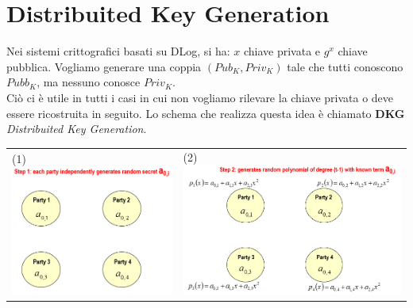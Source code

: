 \documentclass{book}
\begin{document}
\section{Distribuited Key Generation}
Nei sistemi crittografici basati su DLog, si ha: \(x\) chiave privata e \(g^{x}\) chiave pubblica\@. Vogliamo generare una coppia \((Pub_{K},Priv_{K})\) tale che tutti conoscono \(Pubb_{K}\), ma nessuno conosce \(Priv_{K}\).\\ Ciò ci è utile in tutti i casi in cui non vogliamo rilevare la chiave privata o deve essere ricostruita in seguito\@.\newline
Lo schema che realizza questa idea è chiamato \textbf{DKG} \emph{Distribuited Key Generation}\@.\newline
\begin{tabularx}{0.99\textwidth}{X X}
    (1)\includegraphics[scale=0.4]{2022-01-02-15-56-05.png}%
     &
    (2)\includegraphics[scale=0.4]{2022-01-02-15-59-26.png}%

\end{tabularx}
\end{document}
